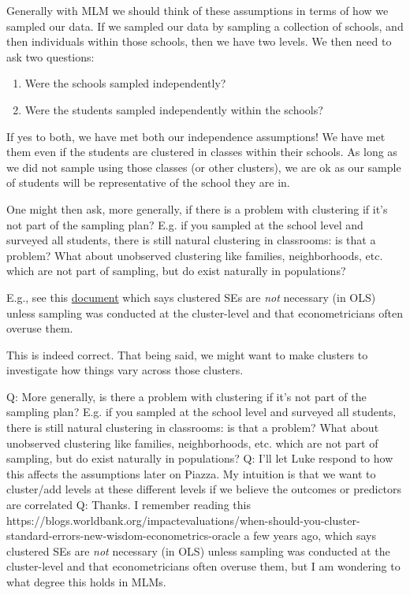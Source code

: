 \documentclass[
  letterpaper,
  DIV=11,
  numbers=noendperiod]{scrreprt}
\begin{document}
Generally with MLM we should think of these assumptions in terms of how
we sampled our data. If we sampled our data by sampling a collection of
schools, and then individuals within those schools, then we have two
levels. We then need to ask two questions:

\begin{enumerate}
\def\labelenumi{(\arabic{enumi})}
\item
  Were the schools sampled independently?
\item
  Were the students sampled independently within the schools?
\end{enumerate}

If yes to both, we have met both our independence assumptions! We have
met them even if the students are clustered in classes within their
schools. As long as we did not sample using those classes (or other
clusters), we are ok as our sample of students will be representative of
the school they are in.

One might then ask, more generally, if there is a problem with
clustering if it's not part of the sampling plan? E.g. if you sampled at
the school level and surveyed all students, there is still natural
clustering in classrooms: is that a problem? What about unobserved
clustering like families, neighborhoods, etc. which are not part of
sampling, but do exist naturally in populations?

E.g., see this
\href{https://blogs.worldbank.org/impactevaluations/when-should-you-cluster-standard-errors-new-wisdom-econometrics-oracle}{document}
which says clustered SEs are \emph{not} necessary (in OLS) unless
sampling was conducted at the cluster-level and that econometricians
often overuse them.

This is indeed correct. That being said, we might want to make clusters
to investigate how things vary across those clusters.

Q: More generally, is there a problem with clustering if it's not part
of the sampling plan? E.g. if you sampled at the school level and
surveyed all students, there is still natural clustering in classrooms:
is that a problem? What about unobserved clustering like families,
neighborhoods, etc. which are not part of sampling, but do exist
naturally in populations? Q: I'll let Luke respond to how this affects
the assumptions later on Piazza. My intuition is that we want to
cluster/add levels at these different levels if we believe the outcomes
or predictors are correlated Q: Thanks. I remember reading this
https://blogs.worldbank.org/impactevaluations/when-should-you-cluster-standard-errors-new-wisdom-econometrics-oracle
a few years ago, which says clustered SEs are \emph{not} necessary (in
OLS) unless sampling was conducted at the cluster-level and that
econometricians often overuse them, but I am wondering to what degree
this holds in MLMs.
\end{document}
